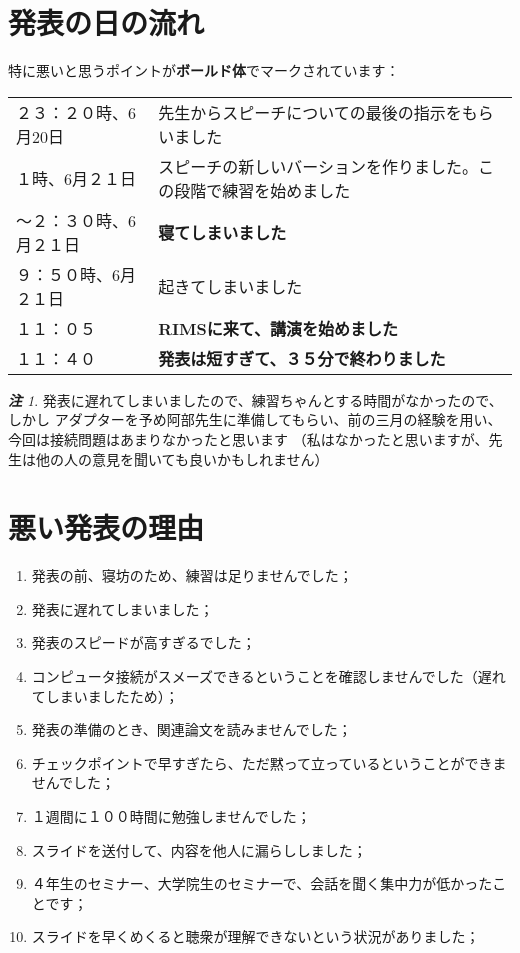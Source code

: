 \documentclass[12pt]{article} %
\theoremstyle{remark}
\newtheorem*{remark*}{\textbf{注}}
\begin{document}
\section{発表の日の流れ}
特に悪いと思うポイントが\textbf{ボールド体}でマークされています：
\begin{center}
	\begin{tabular}[]{lp{}}
		２３：２０時、6月20日&先生からスピーチについての最後の指示をもらいました\\
		１時、6月２１日&スピーチの新しいバーションを作りました。この段階で練習を始めました\\
		〜２：３０時、6月２１日&{\bf 寝てしまいました}\\
		９：５０時、6月２１日&起きてしまいました\\
		１１：０５&{\bf RIMSに来て、講演を始めました}\\
		１１：４０&{\bf 発表は短すぎて、３５分で終わりました}\\
	\end{tabular}
	\begin{remark*}
		発表に遅れてしまいましたので、練習ちゃんとする時間がなかったので、しかし
		アダプターを予め阿部先生に準備してもらい、前の三月の経験を用い、今回は接続問題はあまりなかったと思います
		（私はなかったと思いますが、先生は他の人の意見を聞いても良いかもしれません）
	\end{remark*}
\end{center}
\section{悪い発表の理由}
\begin{enumerate}
	\item 発表の前、寝坊のため、練習は足りませんでした；
	\item 発表に遅れてしまいました；
	\item 発表のスピードが高すぎるでした；
	\item コンピュータ接続がスメーズできるということを確認しませんでした（遅れてしまいましたため）；
	\item 発表の準備のとき、関連論文を読みませんでした；
	\item チェックポイントで早すぎたら、ただ黙って立っているということができませんでした；
	\item １週間に１００時間に勉強しませんでした；
	\item スライドを送付して、内容を他人に漏らししました；
	\item ４年生のセミナー、大学院生のセミナーで、会話を聞く集中力が低かったことです；
	\item スライドを早くめくると聴衆が理解できないという状況がありました；
\end{enumerate}
\end{document}
